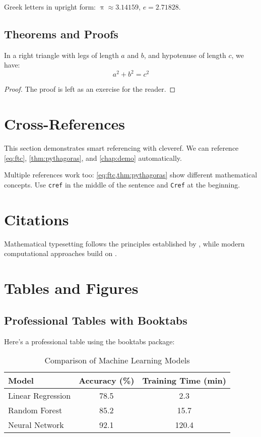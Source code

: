 \documentclass[english]{thesis-uoc}
\begin{document}
Greek letters in upright form: $\uppi \approx 3.14159$, $e = 2.71828$.

\subsection{Theorems and Proofs}

\begin{theorem}
\label{thm:pythagoras}
In a right triangle with legs of length $a$ and $b$, and hypotenuse of length $c$, 
we have:
%
\begin{equation}
a^2 + b^2 = c^2
\end{equation}
%
\end{theorem}

\begin{proof}
The proof is left as an exercise for the reader.
\end{proof}

\section{Cross-References}

This section demonstrates smart referencing with cleveref.
We can reference \cref{eq:ftc},  \cref{thm:pythagoras}, and \cref{chap:demo}
automatically.

Multiple references work too: 
\cref{eq:ftc,thm:pythagoras} show different mathematical concepts.
Use \texttt{cref} in the middle of the sentence and \texttt{Cref} at the beginning.

\section{Citations}

Mathematical typesetting follows the principles established by \cite{knuth1984}, 
while modern computational approaches build on \cite{lecun2015}.

\section{Tables and Figures}

\subsection{Professional Tables with Booktabs}

Here's a professional table using the booktabs package:

\begin{table}[htbp]
\centering
\caption{Comparison of Machine Learning Models}
\label{tab:models}
\begin{tabular}{lcc}
\toprule
Model & Accuracy (\%) & Training Time (min) \\
\midrule
Linear Regression & 78.5 & 2.3 \\
Random Forest & 85.2 & 15.7 \\
Neural Network & 92.1 & 120.4 \\
\bottomrule
\end{tabular}
\end{table}
\end{document}
